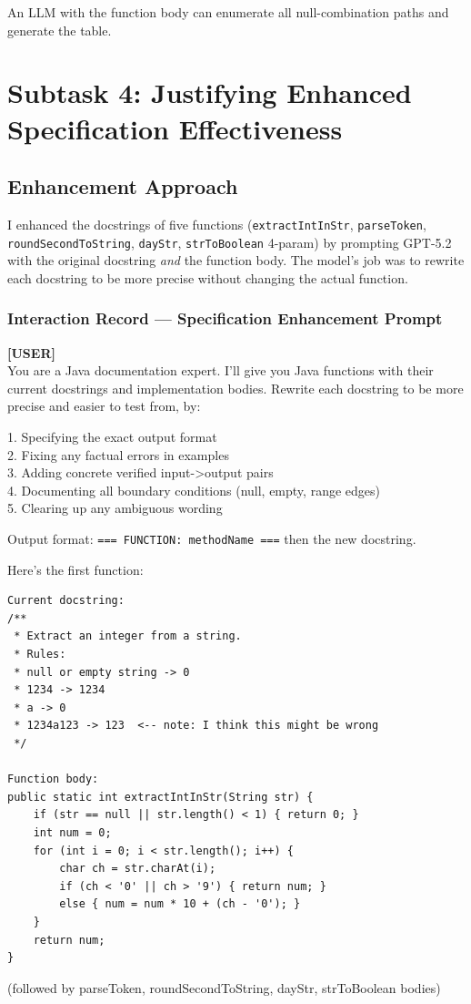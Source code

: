 \documentclass[acmsmall,nonacm]{acmart}
\begin{document}
An LLM with the function body can
enumerate all null-combination paths and generate the table.

\section{Subtask 4: Justifying Enhanced Specification Effectiveness}

\subsection{Enhancement Approach}

I enhanced the docstrings of five functions (\texttt{extractIntInStr},
\texttt{parseToken}, \texttt{roundSecondToString}, \texttt{dayStr},
\texttt{strToBoolean} 4-param) by prompting GPT-5.2 with the original docstring
\emph{and} the function body. The model's job was to rewrite each docstring to be
more precise without changing the actual function.

\subsubsection*{Interaction Record --- Specification Enhancement Prompt}

\begin{promptbox}
\textbf{[USER]}\\[4pt]
You are a Java documentation expert. I'll give you Java functions with their current
docstrings and implementation bodies. Rewrite each docstring to be more precise and
easier to test from, by:

1. Specifying the exact output format\\
2. Fixing any factual errors in examples\\
3. Adding concrete verified input->output pairs\\
4. Documenting all boundary conditions (null, empty, range edges)\\
5. Clearing up any ambiguous wording

Output format:
\texttt{=== FUNCTION: methodName ===}
then the new docstring.

Here's the first function:

\begin{verbatim}
Current docstring:
/**
 * Extract an integer from a string.
 * Rules:
 * null or empty string -> 0
 * 1234 -> 1234
 * a -> 0
 * 1234a123 -> 123  <-- note: I think this might be wrong
 */

Function body:
public static int extractIntInStr(String str) {
    if (str == null || str.length() < 1) { return 0; }
    int num = 0;
    for (int i = 0; i < str.length(); i++) {
        char ch = str.charAt(i);
        if (ch < '0' || ch > '9') { return num; }
        else { num = num * 10 + (ch - '0'); }
    }
    return num;
}
\end{verbatim}

(followed by parseToken, roundSecondToString, dayStr, strToBoolean bodies)
\end{promptbox}
\end{document}
